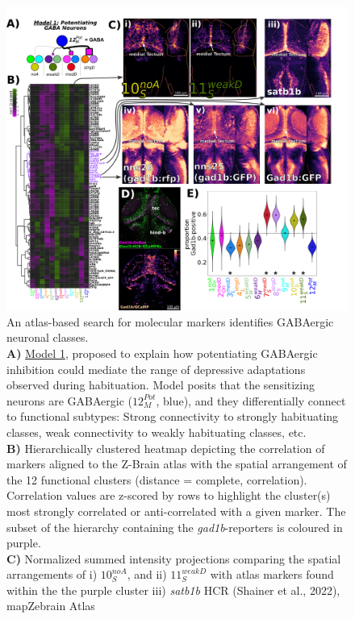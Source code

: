\documentclass[9pt,lineno]{RandlettLab_elife}
\begin{document}
\begin{figure}
\begin{fullwidth}
\begin{center}
\includegraphics[width=0.99\linewidth]{Figure7-GABA.png}
\caption{
An atlas-based search for molecular markers identifies GABAergic neuronal classes. 
\\ \textbf{A)} \underline{Model 1}, proposed to explain how potentiating GABAergic inhibition could mediate the range of depressive adaptations observed during habituation. Model posits that the sensitizing neurons are GABAergic ($12_{M}^{Pot}$, blue), and they differentially connect to functional subtypes: Strong connectivity to strongly habituating classes, weak connectivity to weakly habituating classes, etc. 
\\ \textbf{B)} Hierarchically clustered heatmap depicting the correlation of markers aligned to the Z-Brain atlas with the spatial arrangement of the 12 functional clusters  (distance = complete, correlation). Correlation values are z-scored by rows to highlight the cluster(s) most strongly correlated or anti-correlated with a given marker. The subset of the hierarchy containing the \emph{gad1b}-reporters is coloured in purple. 
\\ \textbf{C)} Normalized summed intensity projections comparing the spatial arrangements of i) $10_{S}^{noA}$, and ii) $11_{S}^{weakD}$
with atlas markers found within the the purple cluster
iii) \emph{satb1b} HCR (Shainer et al., 2022), mapZebrain Atlas
}
\end{center}
\end{fullwidth}
\end{figure}
\end{document}
